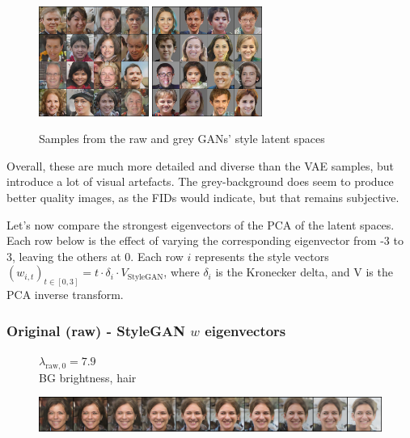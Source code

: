\documentclass{article}
\begin{document}
\begin{figure}[H]
  \centering
  \includegraphics[width=0.32\textwidth]{images/sample_gan_raw.png}
  \includegraphics[width=0.32\textwidth]{images/sample_gan_grey.png}
  \caption{Samples from the raw and grey GANs' style latent spaces}
\end{figure}

Overall, these are much more detailed and diverse than the VAE samples, but introduce a lot of visual artefacts. 
The grey-background does seem to produce better quality images, as the FIDs would indicate, but that remains subjective.

Let's now compare the strongest eigenvectors of the PCA of the latent spaces. 
Each row below is the effect of varying the corresponding eigenvector from -3 to 3, leaving the others at 0. Each row $i$ represents the style vectors $(w_{i, t})_{t \in [0, 3]} = t \cdot \delta_i \cdot V_{\text{StyleGAN}}$, where $\delta_i$ is the Kronecker delta, and V is the PCA inverse transform.


\subsubsection*{Original (raw) - StyleGAN $w$ eigenvectors}


\begin{figure}[H]
  \centering
  \begin{minipage}{.18\linewidth}
      \centering
      $\lambda_{\text{raw}, 0} = 7.9$ \\
      BG brightness, hair
  \end{minipage}%
  \hfill
  \begin{minipage}{.81\linewidth}
      \centering
      \includegraphics[width=\linewidth]{eigen/raw_gan_0.png}
  \end{minipage}
\end{figure}
\end{document}
